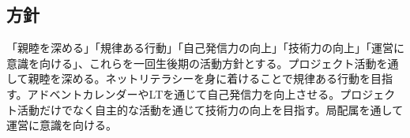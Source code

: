 \subsection*{\firstGrade{}方針}

「親睦を深める」「規律ある行動」「自己発信力の向上」「技術力の向上」「運営に意識を向ける」、これらを一回生後期の活動方針とする。プロジェクト活動を通して親睦を深める。ネットリテラシーを身に着けることで規律ある行動を目指す。アドベントカレンダーやLTを通じて自己発信力を向上させる。プロジェクト活動だけでなく自主的な活動を通じて技術力の向上を目指す。局配属を通して運営に意識を向ける。
